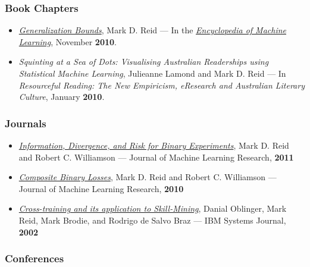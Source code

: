 \documentclass{article}
\begin{document}
\hypertarget{book_chapters}{}\subsubsection*{{Book Chapters}}\label{book_chapters}

\begin{itemize}%
\item \emph{\href{http://dl.dropbox.com/u/38668/Papers/Generalization_Bounds.pdf}{Generalization Bounds}}, Mark D. Reid — In the \emph{\href{http://www.springer.com/computer/ai/book/978-0-387-30768-8}{Encyclopedia of Machine Learning}}, November \textbf{2010}.
\item \emph{Squinting at a Sea of Dots: Visualising Australian Readerships using Statistical Machine Learning}, Julieanne Lamond and Mark D. Reid — In \emph{Resourceful Reading: The New Empiricism, eResearch and Australian Literary Culture}, January \textbf{2010}.

\end{itemize}
\hypertarget{journals}{}\subsubsection*{{Journals}}\label{journals}

\begin{itemize}%
\item \emph{\href{http://jmlr.csail.mit.edu/papers/v12/reid11a.html}{Information, Divergence, and Risk for Binary Experiments}}, Mark D. Reid and Robert C. Williamson — Journal of Machine Learning Research, \textbf{2011}
\item \emph{\href{http://jmlr.csail.mit.edu/papers/v11/reid10a.html}{Composite Binary Losses}}, Mark D. Reid and Robert C. Williamson — Journal of Machine Learning Research, \textbf{2010}
\item \emph{\href{http://mark.reid.dev/files/pubs/isj02.pdf}{Cross-training and its application to Skill-Mining}}, Danial Oblinger, Mark Reid, Mark Brodie, and Rodrigo de Salvo Braz — IBM Systems Journal, \textbf{2002}

\end{itemize}
\hypertarget{conferences}{}\subsubsection*{{Conferences}}\label{conferences}
\end{document}
